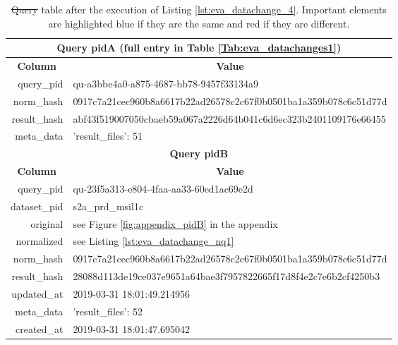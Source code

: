 \documentclass[draft,final]{vutinfth} %
\providecommand{\DIFaddtex}[1]{{\protect\color{blue}\uwave{#1}}} %
\providecommand{\DIFdeltex}[1]{{\protect\color{red}\sout{#1}}}                      %
\providecommand{\DIFaddFL}[1]{\DIFadd{#1}} %
\providecommand{\DIFdelFL}[1]{\DIFdel{#1}} %
\providecommand{\DIFaddbeginFL}{} %
\providecommand{\DIFaddendFL}{} %
\providecommand{\DIFdelbeginFL}{} %
\providecommand{\DIFdelendFL}{} %
\providecommand{\DIFadd}[1]{\texorpdfstring{\DIFaddtex{#1}}{#1}} %
\providecommand{\DIFdel}[1]{\texorpdfstring{\DIFdeltex{#1}}{}} %
\begin{document}
\begin{enumerate}
	\begin{table}[]
		\caption{\DIFdelbeginFL \DIFdelFL{Query }\DIFdelendFL \DIFaddbeginFL \textit{\DIFaddFL{Query}} \DIFaddendFL table after the execution of Listing \ref{lst:eva_datachange_4}. Important elements are highlighted blue if they are the same and red if they are different.}
		\centering
		\begin{tabular}{|r|l|}
			\hline \multicolumn{2}{|c|}{\textbf{Query pidA (full entry in Table \ref{Tab:eva_datachanges1})}} \\
			\hline \multicolumn{1}{|c|}{\textbf{Column}}  &  \multicolumn{1}{c|}{\textbf{Value}} \\ \hline
			query\_pid & {\color{red}qu-a3bbe4a0-a875-4687-bb78-9457f33134a9}  \\ 
			norm\_hash & {\color{blue}0917c7a21cec960b8a6617b22ad26578c2c67f0b0501ba1a359b078c6c51d77d}  \\
			result\_hash & {\color{red}abf43f519007050cbaeb59a067a2226d64b041c6d6ec323b2401109176e66455}   \\
			meta\_data & {'result\_files': 51}  \\
			\hline \multicolumn{2}{|c|}{\textbf{Query pidB}} \\
			\hline \multicolumn{1}{|c|}{\textbf{Column}}  &  \multicolumn{1}{c|}{\textbf{Value}} \\ \hline
			query\_pid & { \color{red} qu-23f5a313-e804-4faa-aa33-60ed1ac69e2d}  \\ 
			dataset\_pid & s2a\_prd\_msil1c  \\ 
			original & see Figure \ref{fig:appendix_pidB} in the appendix \\
			normalized & see Listing \ref{lst:eva_datachange_nq1}  \\
			norm\_hash & {\color{blue}0917c7a21cec960b8a6617b22ad26578c2c67f0b0501ba1a359b078c6c51d77d}  \\
			result\_hash & {\color{red}28088d113de19ce037e9651a64bae3f7957822665f17d8f4e2c7e6b2cf4250b3 }  \\
			updated\_at & 2019-03-31 18:01:49.214956   \\
			meta\_data & {\color{red}'result\_files': 52}  \\
			created\_at & 2019-03-31 18:01:47.695042   \\ \hline
		\end{tabular}
		\label{Tab:eva_datachanges3}
	\end{table}


\end{enumerate}
\end{document}
